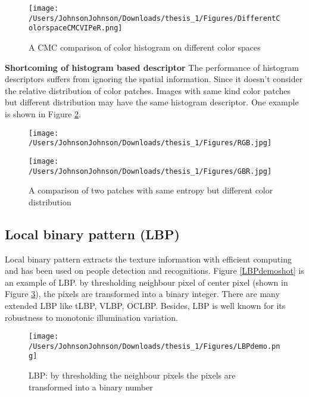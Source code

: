 \begin{figure}
\centering
\texttt{[image: /Users/JohnsonJohnson/Downloads/thesis\_1/Figures/DifferentColorspaceCMCVIPeR.png]}
\caption{A CMC comparison of color histogram on different color spaces }
\label{CMCcolorspaces}
\vspace{0em}
\end{figure} 


\textbf{Shortcoming of histogram based descriptor} The performance of histogram descriptors suffers from ignoring the spatial information. Since it doesn't consider the relative distribution of color patches. Images with same kind color patches but different distribution may have the same histogram descriptor. One example is shown in Figure \ref{RGBbgr}.

\begin{figure}[H]
\begin{minipage}[t]{0.5\linewidth}
\centering
\texttt{[image: /Users/JohnsonJohnson/Downloads/thesis\_1/Figures/RGB.jpg]}
\end{minipage}%
\begin{minipage}[t]{0.5\linewidth}
\centering
\texttt{[image: /Users/JohnsonJohnson/Downloads/thesis\_1/Figures/GBR.jpg]}
\end{minipage}
\caption{A comparison of two patches with same entropy but different color distribution}
\label{RGBbgr}
\end{figure}


\subsection{Local binary pattern (LBP)}
Local binary pattern \cite{LBP1, LBP2} extracts the texture information with efficient computing and has been used on people detection and recognitions. Figure \ref{LBPdemoshot} is an example of LBP. by thresholding neighbour pixel of center pixel (shown in Figure \ref{LBPtheory}), the pixels are transformed into a binary integer. There are many extended LBP like tLBP, VLBP, OCLBP. Besides, LBP is well known for its robustness to monotonic illumination variation.
\begin{figure}[H]
\centering
\texttt{[image: /Users/JohnsonJohnson/Downloads/thesis\_1/Figures/LBPdemo.png]}
\caption{LBP: by thresholding the neighbour pixels the pixels are transformed into a binary number }
\label{LBPtheory}
\vspace{0em}
\end{figure}



